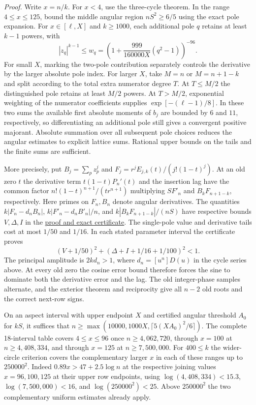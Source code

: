 \emph{Proof.}
Write $x=n/k$. For $x<4$, use the three-cycle theorem. In the range
$4\le x\le125$, bound the middle angular region $nS^2\ge6/5$ using
the exact pole expansion. For $x\in[\ell,X]$ and $k\ge1000$,
each additional pole $q$ retains at least $k-1$ powers, with
\[
 |z_q|^{k-1}\le w_q=
 \left(1+\frac{999}{160000X}(q^2-1)\right)^{-96}.
\]
For small $X$, marking the two-pole contribution separately controls the
derivative by the larger absolute pole index. For larger $X$, take $M=n$
or $M=n+1-k$ and split according to the total extra numerator degree $T$.
At $T\le M/2$ the distinguished pole retains at least $M/2$ powers.
At $T>M/2$, exponential weighting of the numerator coefficients supplies
$\exp[-(\ell-1)/8]$. In these two sums the available first absolute
moments of $b_j$ are bounded by $6$ and $11$, respectively, so
differentiating an additional pole still gives a convergent positive
majorant. Absolute summation over all subsequent pole choices reduces
the angular estimates to explicit lattice sums. Rational upper bounds on
the tails and the finite sums are sufficient.

More precisely, put $B_j=\sum_p z_p^j$ and
$F_j=r^jE_{j,k}(t)/(j!(1-t)^j)$. At an old zero $t$ the derivative
term $t(1-t)P_n'(t)$ and the insertion lag have the common factor
$n!(1-t)^{n+1}/(t r^{n+1})$ multiplying $SF'_n$ and
$B_k F_{n+1-k}$, respectively. Here primes on $F_n,B_n$ denote angular
derivatives. The quantities $k|F_n-d_nB_n|$,
$k|F'_n-d_nB'_n|/n$, and $k|B_k F_{n+1-k}|/(nS)$ have respective
bounds $V,\Delta,I$ in the
\href{https://github.com/ProgramComputer/open-math-research/tree/main/topics/long-cycle-excedances/adaptive-poles}{proof and exact certificate}.
The single-pole value and derivative tails cost at most $1/50$ and $1/16$.
In each stated parameter interval the certificate proves
\[
(V+1/50)^2+(\Delta+I+1/16+1/100)^2<1.
\]
The principal amplitude is $2kd_n>1$, where $d_n=[u^n]D(u)$ in the
cycle series above. At every old zero the cosine error bound therefore
forces the sine to dominate both the derivative error and the lag.
The old integer-phase samples alternate, and the exterior theorem and
reciprocity give all $n-2$ old roots and the correct next-row signs.

On an aspect interval with upper endpoint $X$ and certified angular
threshold $A_0$ for $kS$, it suffices that
$n\ge\max(10000,1000X,\lceil5(XA_0)^2/6\rceil)$. The complete
18-interval table covers $4\le x\le96$ once $n\ge4{,}062{,}720$,
through $x=100$ at $n\ge4{,}408{,}334$, and through $x=125$ at
$n\ge7{,}500{,}000$. For $400\le k$ the wider-circle criterion covers
the complementary larger $x$ in each of these ranges up to $250000^2$.
Indeed $0.89x>47+2.5\log n$ at the respective joining values
$x=96,100,125$ at their upper row endpoints, using
$\log(4{,}408{,}334)<15.3$, $\log(7{,}500{,}000)<16$, and
$\log(250000^2)<25$. Above $250000^2$ the two complementary uniform
estimates already apply.

